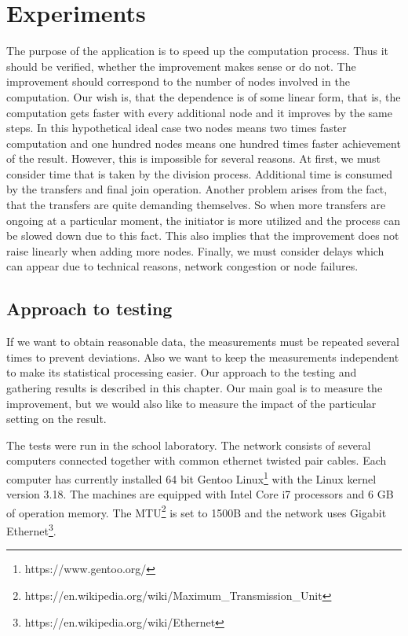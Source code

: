 \chapter{Experiments}\label{experiments}

The purpose of the application is to speed up the computation process.
Thus it should be verified, whether the improvement makes sense or do
not. The improvement should correspond to the number of nodes involved
in the computation. Our wish is, that the dependence is of some linear
form, that is, the computation gets faster with every additional node
and it improves by the same steps. In this hypothetical ideal case two
nodes means two times faster computation and one hundred nodes means one
hundred times faster achievement of the result. However, this is
impossible for several reasons. At first, we must consider time that is
taken by the division process. Additional time is consumed by the
transfers and final join operation. Another problem arises from the
fact, that the transfers are quite demanding themselves. So when more
transfers are ongoing at a particular moment, the initiator is more
utilized and the process can be slowed down due to this fact. This also
implies that the improvement does not raise linearly when adding more
nodes. Finally, we must consider delays which can appear due to
technical reasons, network congestion or node failures.

\section{Approach to testing}\label{approach-to-testing}

If we want to obtain reasonable data, the measurements must be repeated
several times to prevent deviations. Also we want to keep the
measurements independent to make its statistical processing easier. Our
approach to the testing and gathering results is described in this
chapter. Our main goal is to measure the improvement, but we would also
like to measure the impact of the particular setting on the result.

The tests were run in the school laboratory. The network consists of
several computers connected together with common ethernet twisted pair
cables. Each computer has currently installed 64 bit Gentoo
Linux\footnote{https://www.gentoo.org/} with the Linux kernel version
3.18. The machines are equipped with Intel Core i7 processors and 6 GB
of operation memory. The
MTU\footnote{https://en.wikipedia.org/wiki/Maximum\_Transmission\_Unit}
is set to 1500B and the network uses Gigabit
Ethernet\footnote{https://en.wikipedia.org/wiki/Ethernet}.


